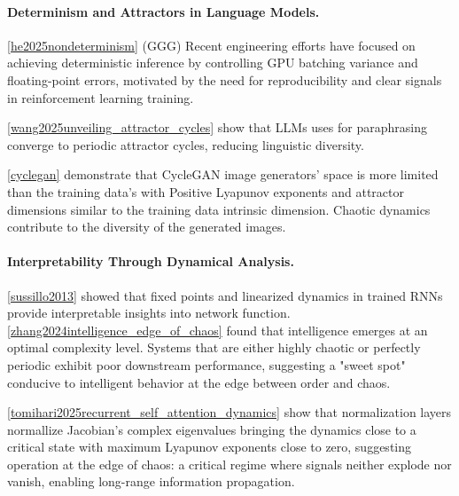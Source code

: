 \documentclass[a4paper,12pt]{article}
\begin{document}
\paragraph{Determinism and Attractors in Language Models.}
\ref{he2025nondeterminism} (GGG)
Recent engineering efforts have focused on achieving deterministic inference by controlling GPU batching variance and floating-point errors, motivated by the need for reproducibility and clear signals in reinforcement learning training. 

\ref{wang2025unveiling_attractor_cycles} show that LLMs uses for paraphrasing converge to periodic attractor cycles, reducing linguistic diversity.

\ref{cyclegan} %
demonstrate that CycleGAN image generators' space is more limited than the training data's with Positive Lyapunov exponents and attractor dimensions similar to the training data intrinsic dimension. Chaotic dynamics contribute to the diversity of the generated images.

\paragraph{Interpretability Through Dynamical Analysis.}
\ref{sussillo2013} showed that fixed points and linearized dynamics in trained RNNs provide interpretable insights into network function. \ref{zhang2024intelligence_edge_of_chaos} found that intelligence emerges at an optimal complexity level. Systems that are either highly chaotic or perfectly periodic exhibit poor downstream performance, suggesting a "sweet spot" conducive to intelligent behavior at the edge between order and chaos.


\ref{tomihari2025recurrent_self_attention_dynamics} show that normalization layers normallize Jacobian's complex eigenvalues bringing the dynamics close to a critical state with maximum Lyapunov exponents close to zero, suggesting operation at the edge of chaos: a critical regime where signals neither explode nor vanish, enabling long-range information propagation.
\end{document}
